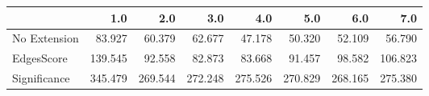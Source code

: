 \begin{tabular}{lrrrrrrr}
\toprule
{} &     1.0 &     2.0 &     3.0 &     4.0 &     5.0 &     6.0 &     7.0 \\
\midrule
No Extension &  83.927 &  60.379 &  62.677 &  47.178 &  50.320 &  52.109 &  56.790 \\
EdgesScore   & 139.545 &  92.558 &  82.873 &  83.668 &  91.457 &  98.582 & 106.823 \\
Significance & 345.479 & 269.544 & 272.248 & 275.526 & 270.829 & 268.165 & 275.380 \\
\bottomrule
\end{tabular}
